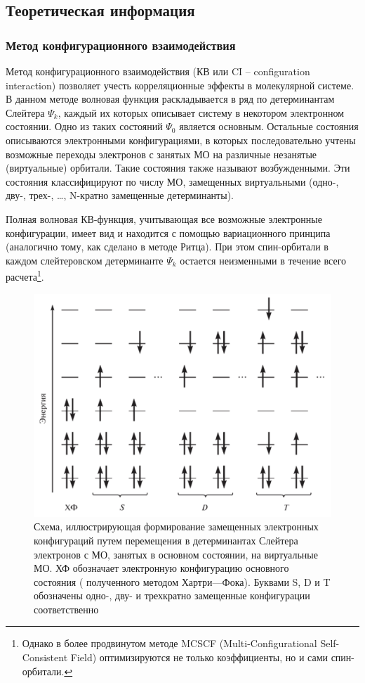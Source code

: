 \subsection{Теоретическая информация}
\subsubsection{Метод конфигурационного взаимодействия}
Метод конфигурационного взаимодействия (КВ или CI -- configuration interaction) позволяет учесть корреляционные эффекты в молекулярной системе. В данном методе волновая функция раскладывается в ряд по детерминантам Слейтера $\Psi_k$, каждый их которых описывает систему в некотором электронном состоянии. Одно из таких состояний $\Psi_0$ является основным. Остальные состояния описываются электронными конфигурациями, в которых последовательно учтены возможные переходы электронов с занятых МО на различные незанятые (виртуальные) орбитали. Такие состояния также называют возбужденными. Эти состояния классифицируют по числу МО, замещенных виртуальными (одно-, дву-, трех-, \ldots, N-кратно замещенные детерминанты). 

Полная волновая КВ-функция, учитывающая все возможные электронные конфигурации, имеет вид
и находится с помощью вариационного принципа (аналогично тому, как сделано в методе Ритца). При этом спин-орбитали в каждом слейтеровском детерминанте $\Psi_k$ остается неизменными в течение всего расчета\footnote{Однако в более продвинутом методе MCSCF (Multi-Configurational Self-Consistent Field) оптимизируются не только коэффициенты, но и сами спин-орбитали.}.

\begin{figure}[H]
\centering
\captionsetup{justification=centering}
\includegraphics[scale=0.5]{fig/2.png}
\caption{Схема, иллюстрирующая формирование замещенных электронных конфигураций путем перемещения в детерминантах Слейтера электронов с МО, занятых в основном состоянии, на виртуальные МО. ХФ обозначает электронную конфигурацию основного состояния ( полученного методом Хартри—Фока). Буквами S, D и T обозначены одно-, дву- и трехкратно замещенные конфигурации соответственно}
\end{figure}

